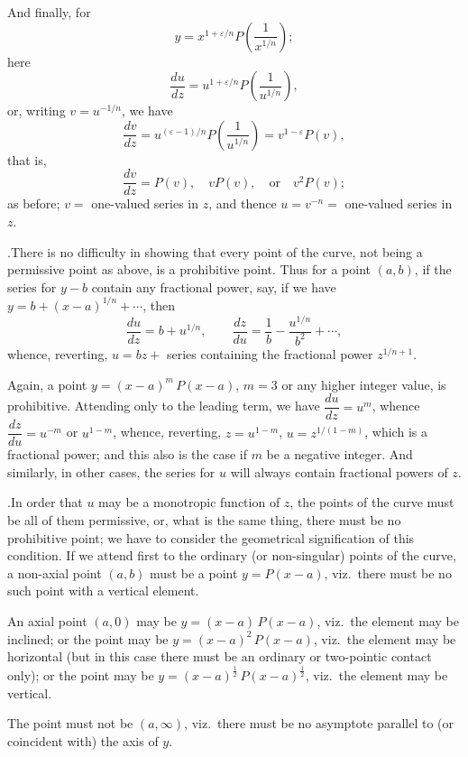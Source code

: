 \documentclass[11pt]{article}
\begin{document}
And finally, for
\[
y=x^{1+\varepsilon/n}P\!\left(\frac{1}{x^{1/n}}\right);
\]
here
\[
\frac{du}{dz}=u^{1+\varepsilon/n}P\!\left(\frac{1}{u^{1/n}}\right),
\]
or, writing $v = u^{-1/n}$, we have
\[
\frac{dv}{dz}=u^{(\varepsilon-1)/n}P\!\left(\frac{1}{u^{1/n}}\right)=v^{1-\varepsilon}P(v),
\]
that is,
\[
\frac{dv}{dz}=P(v),\quad vP(v),\quad\text{or}\quad v^{2}P(v);
\]
as before; $v=$ one-valued series in $z$, and thence $u = v^{-n} =$ one-valued series in $z$.

\medskip

.\quad There is no difficulty in showing that every point of the curve, not being a permissive point as above, is a prohibitive point. Thus for a point $(a,b)$, if the series for $y-b$ contain any fractional power, say, if we have $y = b + (x-a)^{1/n} + \cdots$, then
\[
\frac{du}{dz} = b + u^{1/n}, \qquad \frac{dz}{du} = \frac{1}{b} - \frac{u^{1/n}}{b^{2}} + \cdots,
\]
whence, reverting, $u = bz +$ series containing the fractional power $z^{1/n+1}$.

Again, a point $y = (x-a)^{m}\,P(x-a)$, $m=3$ or any higher integer value, is prohibitive. Attending only to the leading term, we have $\dfrac{du}{dz} = u^{m}$, whence $\dfrac{dz}{du} = u^{-m}$ or $u^{1-m}$, whence, reverting, $z = u^{1-m}$, $u = z^{1/(1-m)}$, which is a fractional power; and this also is the case if $m$ be a negative integer. And similarly, in other cases, the series for $u$ will always contain fractional powers of $z$.

\medskip

.\quad In order that $u$ may be a monotropic function of $z$, the points of the curve must be all of them permissive, or, what is the same thing, there must be no prohibitive point; we have to consider the geometrical signification of this condition. If we attend first to the ordinary (or non-singular) points of the curve, a non-axial point $(a,b)$ must be a point $y = P(x-a)$, viz.\ there must be no such point with a vertical element.

An axial point $(a,0)$ may be $y = (x-a)\,P(x-a)$, viz.\ the element may be inclined; or the point may be $y = (x-a)^{2}\,P(x-a)$, viz.\ the element may be horizontal (but in this case there must be an ordinary or two-pointic contact only); or the point may be $y = (x-a)^{\frac{1}{2}}\,P(x-a)^{\frac{1}{2}}$, viz.\ the element may be vertical.

The point must not be $(a,\infty)$, viz.\ there must be no asymptote parallel to (or coincident with) the axis of $y$.
\end{document}
